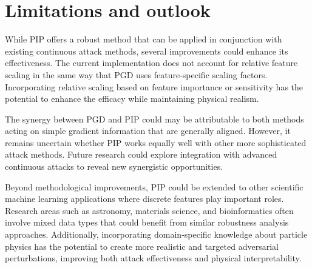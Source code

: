 \newpage

\section*{Limitations and outlook}

While PIP offers a robust method that can be applied in conjunction with existing continuous attack methods, several improvements could enhance its effectiveness. The current implementation does not account for relative feature scaling in the same way that PGD uses feature-specific scaling factors. Incorporating relative scaling based on feature importance or sensitivity has the potential to enhance the efficacy while maintaining physical realism.

The synergy between PGD and PIP could may be attributable to both methods acting on simple gradient information that are generally aligned. However, it remains uncertain whether PIP works equally well with other more sophisticated attack methods. Future research could explore integration with advanced continuous attacks to reveal new synergistic opportunities.

Beyond methodological improvements, PIP could be extended to other scientific machine learning applications where discrete features play important roles. Research areas such as astronomy, materials science, and bioinformatics often involve mixed data types that could benefit from similar robustness analysis approaches. Additionally, incorporating domain-specific knowledge about particle physics has the potential to create more realistic and targeted adversarial perturbations, improving both attack effectiveness and physical interpretability.